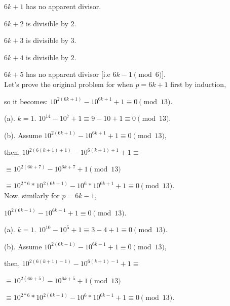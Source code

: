 \documentclass[12pt]{article}
\begin{document}
\begin{enumerate}
    $6k + 1$ has no apparent divisor.

    $6k + 2$ is divisible by $2$.

    $6k + 3$ is divisible by $3$.

    $6k + 4$ is divisible by $2$.

    $6k + 5$ has no apparent divisor [i.e $6k - 1 \pmod 6$]. \\

    Let's prove the original problem for when $p = 6k + 1$ first by induction,

    so it becomes: $10^{2(6k + 1)} - 10^{6k + 1} + 1 \equiv 0 \pmod{13}$.

    (a). $k = 1$. $10^{14} - 10^7 + 1 \equiv 9 - 10 + 1 \equiv 0 \pmod{13}$.

    (b). Assume $10^{2(6k + 1)} - 10^{6k + 1} + 1 \equiv 0 \pmod{13}$,

    then, $10^{2(6(k + 1) + 1)} - 10^{6(k + 1) + 1} + 1 \equiv$

    $\equiv 10^{2(6k + 7)} - 10^{6k + 7} + 1 \pmod{13}$

    $\equiv 10^{2*6} * 10^{2(6k + 1)} - 10^6 * 10^{6k + 1} + 1 \equiv 0 \pmod{13}$. \\

    Now, similarly for $p = 6k - 1$,

    $10^{2(6k - 1)} - 10^{6k - 1} + 1 \equiv 0 \pmod{13}$.

    (a). $k = 1$. $10^{10} - 10^5 + 1 \equiv 3 - 4 + 1 \equiv 0 \pmod{13}$.

    (b). Assume $10^{2(6k - 1)} - 10^{6k - 1} + 1 \equiv 0 \pmod{13}$,

    then, $10^{2(6(k + 1) - 1)} - 10^{6(k + 1) - 1} + 1 \equiv$

    $\equiv 10^{2(6k + 5)} - 10^{6k + 5} + 1 \pmod{13}$

    $\equiv 10^{2*6} * 10^{2(6k - 1)} - 10^6 * 10^{6k - 1} + 1 \equiv 0 \pmod{13}$.

\end{enumerate}
\end{document}
